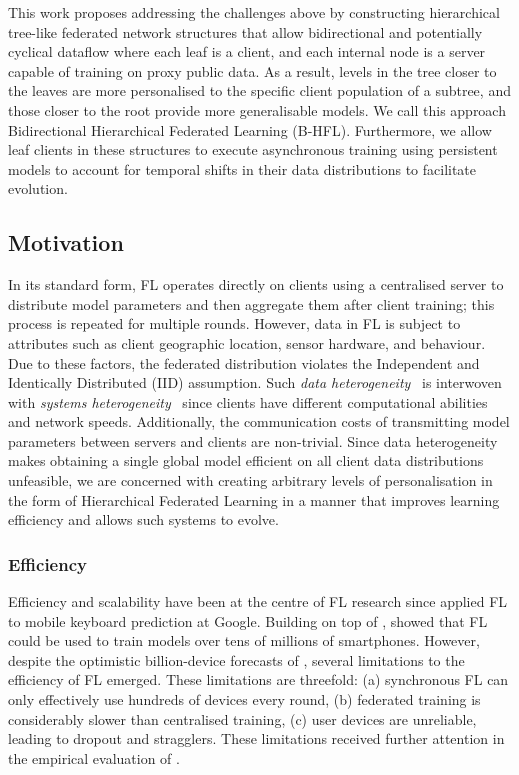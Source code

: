 This work proposes addressing the challenges above by constructing hierarchical tree-like federated network structures that allow bidirectional and potentially cyclical dataflow where each leaf is a client, and each internal node is a server capable of training on proxy public data. As a result, levels in the tree closer to the leaves are more personalised to the specific client population of a subtree, and those closer to the root provide more generalisable models. We call this approach Bidirectional Hierarchical Federated Learning (B-HFL). Furthermore, we allow leaf clients in these structures to execute asynchronous training using persistent models to account for temporal shifts in their data distributions to facilitate evolution.
\subsection{Motivation}

In its standard form, FL operates directly on clients using a centralised server to distribute model parameters and then aggregate them after client training; this process is repeated for multiple rounds. However, data in FL is subject to attributes such as client geographic location, sensor hardware, and behaviour. Due to these factors, the federated distribution violates the Independent and Identically Distributed (IID) assumption. Such \emph{data heterogeneity}~\citep[sec. 3.1]{AdvancedAndOpenProblems} is interwoven with \emph{systems heterogeneity}~\citep[sec. 7.2]{AdvancedAndOpenProblems} since clients have different computational abilities and network speeds. Additionally, the communication costs of transmitting model parameters between servers and clients are non-trivial. Since data heterogeneity makes obtaining a single global model efficient on all client data distributions unfeasible, we are concerned with creating arbitrary levels of personalisation in the form of Hierarchical Federated Learning in a manner that improves learning efficiency and allows such systems to evolve.
\subsubsection{Efficiency}

Efficiency and scalability have been at the centre of FL research since \citet{GoogleKeyboard} applied FL to mobile keyboard prediction at Google. Building on top of \citet{GoogleKeyboard}, \citet{ScaleSystemDesign} showed that FL could be used to train models over tens of millions of smartphones. However, despite the optimistic billion-device forecasts of \citet{ScaleSystemDesign}, several limitations to the efficiency of FL emerged. These limitations are threefold: (a) synchronous FL can only effectively use hundreds of devices every round, (b) federated training is considerably slower than centralised training, (c) user devices are unreliable, leading to dropout and stragglers. These limitations received further attention in the empirical evaluation of \citet{LargeCohorts}.

